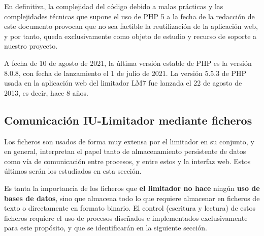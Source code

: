 En definitiva, la complejidad del código debido a malas prácticas y las complejidades técnicas que supone el uso de PHP 5 a la fecha de la redacción de este documento provocan que no sea factible la reutilización de la aplicación web, y por tanto, queda exclusivamente como objeto de estudio y recurso de soporte a nuestro proyecto.

\begin{shaded}
    \noindent
    A fecha de 10 de agosto de 2021, la última versión estable de PHP es la versión 8.0.8, con fecha de lanzamiento el 1 de julio de 2021. La versión 5.5.3 de PHP usada en la aplicación web del limitador \acrshort{LM7} fue lanzada el 22 de agosto de 2013, es decir, hace 8 años.
\end{shaded}

\subsection{Comunicación IU-Limitador mediante ficheros} \label{sec:iu-limitador-ficheros}

Los ficheros son usados de forma muy extensa por el limitador en su conjunto, y en general, interpretan el papel tanto de almacenamiento persistente de datos como vía de comunicación entre procesos, y entre estos y la interfaz web. Estos últimos serán los estudiados en esta sección.

Es tanta la importancia de los ficheros que \textbf{el limitador no hace} ningún \textbf{uso de bases de datos}, sino que almacena todo lo que requiere almacenar en ficheros de texto o directamente en formato binario. El control (escritura y lectura) de estos ficheros requiere el uso de procesos diseñados e implementados exclusivamente para este propósito, y que se identificarán en la siguiente sección.

